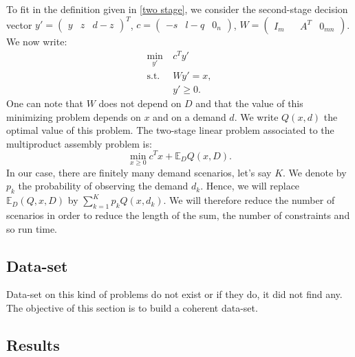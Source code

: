 \documentclass{amsart}
\begin{document}
To fit in the definition given in \ref{two stage}, we consider the second-stage decision vector $y'=\begin{pmatrix} y &z&d-z\end{pmatrix}^T$, $c=\begin{pmatrix}-s & l-q & 0_n\end{pmatrix}$, $W=\begin{pmatrix} I_m &  & A^T &0_{mn}\end{pmatrix}$. We now write:
\begin{align*}
    \min_{y'} \:&c^Ty' \\
     \text{s.t. } &Wy'=x, \\
     & y'\geq0.
\end{align*}
One can note that $W$ does not depend on $D$ and that the value of this minimizing problem depends on $x$ and on a demand $d$. We write $Q\left(x,d\right)$ the optimal value of this problem. The two-stage linear problem associated to the multiproduct assembly problem is:
$$\min_{x\geq0}c^Tx+\mathbb{E}_DQ\left(x,D\right).$$
In our case, there are finitely many demand scenarios, let's say $K$. We denote by $p_k$ the probability of observing the demand $d_k$. Hence, we will replace $\mathbb{E}_D\left(Q,x,D\right)$ by $\sum_{k=1}^Kp_kQ\left(x,d_k\right)$. We will therefore reduce the number of scenarios in order to reduce the length of the sum, the number of constraints and so run time.
\subsection{Data-set}
Data-set on this kind of problems do not exist or if they do, it did not find any. The objective of this section is to build a coherent data-set.
\subsection{Results}
\clearpage
\appendix
\end{document}
